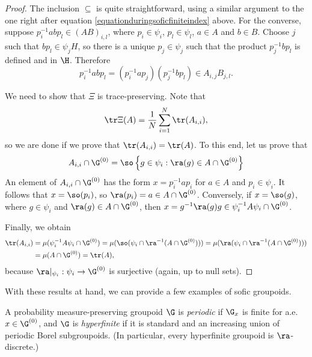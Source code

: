 \begin{proof}
The inclusion $\subseteq$ is quite straightforward, using a similar argument to the one right after equation \ref{equationduringsoficfiniteindex} above. For the converse, suppose $p_i^{-1}abp_l\in(AB)_{i,l}$, where $p_i\in\psi_i$, $p_l\in\psi_l$, $a\in A$ and $b\in B$. Choose $j$ such that $bp_l\in\psi_j H$, so there is a unique $p_j\in\psi_j$ such that the product $p_j^{-1}bp_l$ is defined and in $\H$. Therefore %
\[p_i^{-1}abp_l=(p_i^{-1}a p_j)(p_j^{-1}bp_l)\in A_{i,j}B_{j,l}.\]

We need to show that $\Xi$ is trace-preserving. Note that
\[\tr\Xi(A)=\frac{1}{N}\sum_{i=1}^N\tr(A_{i,i}),\]
so we are done if we prove that $\tr(A_{i,i})=\tr(A)$. To this end, let us prove that
\[A_{i,i}\cap\G^{(0)}=\so\left\{g\in\psi_i:\ra(g)\in A\cap\G^{(0)}\right\}\]
An element of $A_{i,i}\cap \G^{(0)}$ has the form $x=p_i^{-1}ap_i$ for $a\in A$ and $p_i\in\psi_i$. It follows that $x=\so(p_i)$, so $\ra(p_i)=a\in A\cap \G^{(0)}$. Conversely, if $x=\so(g)$, where $g\in\psi_i$ and $\ra(g)\in A\cap \G^{(0)}$, then $x=g^{-1}\ra(g)g\in\psi_i^{-1}A\psi_i\cap \G^{(0)}$.

Finally, we obtain
\begin{align*}
\tr(A_{i,i})&=\mu(\psi_i^{-1}A\psi_i\cap \G^{(0)})=\mu(\so(\psi_i\cap \ra^{-1}(A\cap \G^{(0)})))=\mu(\ra(\psi_i\cap \ra^{-1}(A\cap \G^{(0)})))\\
&=\mu(A\cap \G^{(0)})=\tr(A),
\end{align*}
because $\ra|_{\psi_i}:\psi_i\to \G^{(0)}$ is surjective (again, up to null sets).\qedhere
\end{proof}

With these results at hand, we can provide a few examples of sofic groupoids.

\begin{definition}
A probability measure-preserving groupoid $\G$ is \emph{periodic} if $\G_x$ is finite for a.e.\ $x\in\G^{(0)}$, and $\G$ is \emph{hyperfinite} if it is standard and an increasing union of periodic Borel subgroupoids. (In particular, every hyperfinite groupoid is $\ra$-discrete.)
\end{definition}

